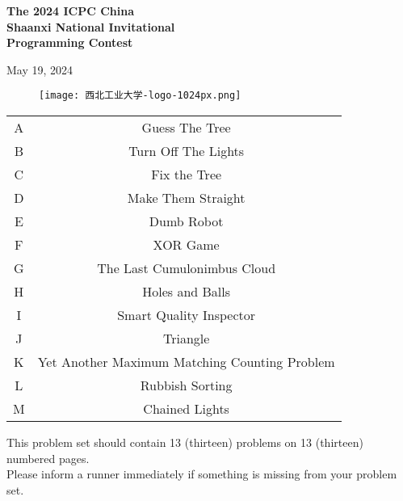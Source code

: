 \documentclass[a4paper]{article}
\begin{document}
\begin{titlepage}
    \centering\huge\textbf{The 2024 ICPC China\\ Shaanxi National Invitational \\Programming Contest}
    \vspace{0.03\textheight}
    

    \vspace{0.05\textheight}
    
    \centering\Large{May 19, 2024}

    \begin{figure}[h]
        \centering
        \texttt{[image: 西北工业大学-logo-1024px.png]}
    \end{figure}

    \vspace{0.05\textheight}


    
    \begin{table}[h]
        \centering
        \begin{tabular}{|c|c|}
        \hline
             A&Guess The Tree \\
             B&Turn Off The Lights \\
             C&Fix the Tree \\
             D&Make Them Straight \\
             E&Dumb Robot \\
             F&XOR Game \\
             G&The Last Cumulonimbus Cloud \\
             H&Holes and Balls \\
             I&Smart Quality Inspector \\
             J&Triangle \\
             K&Yet Another Maximum Matching Counting Problem \\
             L&Rubbish Sorting \\
             M&Chained Lights \\
        \hline
        \end{tabular}
    \end{table}
    \small{This problem set should contain 13 (thirteen) problems on 13 (thirteen) numbered pages.\\Please inform a runner immediately if something is missing from your problem set.}
\end{titlepage}
\end{document}
